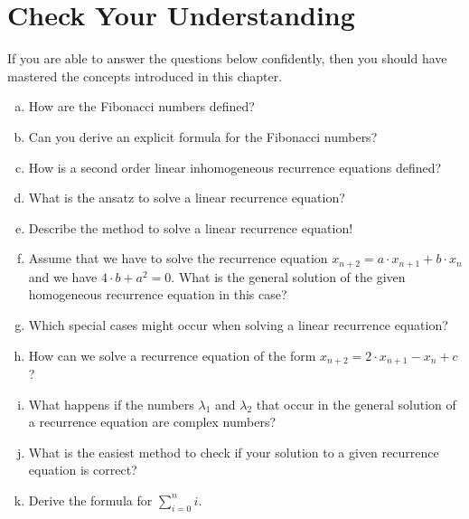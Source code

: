 \section{Check Your Understanding}
If you are able to answer the questions below confidently, then you should have mastered the concepts
introduced in this chapter.
\begin{enumerate}[(a)]
\item How are the Fibonacci numbers defined?
\item Can you derive an explicit formula for the Fibonacci numbers?
\item How is a second order linear inhomogeneous recurrence equations defined?  
\item What is the ansatz to solve a linear  recurrence equation?
\item Describe the method to solve a linear  recurrence equation!
\item Assume that we have to solve the recurrence equation $x_{n+2} = a \cdot x_{n+1} + b \cdot x_n$
      and we have $4 \cdot b + a^2 = 0$.  What is the general solution of the given homogeneous
      recurrence equation in this case?
\item Which special cases might occur when solving a linear recurrence equation?
\item How can we solve a recurrence equation of the form $x_{n+2} = 2 \cdot x_{n+1} - x_n + c$?
\item What happens if the numbers $\lambda_1$ and $\lambda_2$ that occur in the general solution
      of a recurrence equation are complex numbers?
\item What is the easiest method to check if your solution to a given recurrence equation is correct?  
\item Derive the formula for $\sum\limits_{i=0}^n i$.
\end{enumerate}


